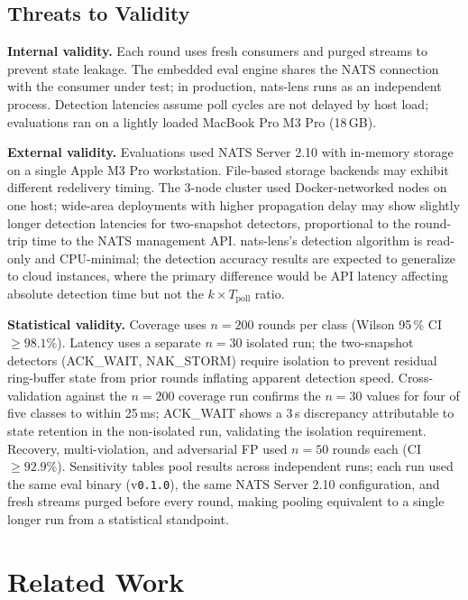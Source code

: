 \documentclass[sigconf,nonacm]{acmart}
\begin{document}
\subsection{Threats to Validity}
\label{sec:threats}

\textbf{Internal validity.} Each round uses fresh consumers and purged
streams to prevent state leakage. The embedded eval engine shares the
NATS connection with the consumer under test; in production, nats-lens
runs as an independent process. Detection latencies assume poll cycles
are not delayed by host load; evaluations ran on a lightly loaded
MacBook Pro M3 Pro (18\,GB).

\textbf{External validity.} Evaluations used NATS Server 2.10 with
in-memory storage on a single Apple M3 Pro workstation.
File-based storage backends may exhibit different redelivery timing.
The 3-node cluster used Docker-networked nodes on one host; wide-area
deployments with higher propagation delay may show slightly longer
detection latencies for two-snapshot detectors, proportional to the
round-trip time to the NATS management API.
nats-lens's detection algorithm is read-only and CPU-minimal; the
detection accuracy results are expected to generalize to cloud instances,
where the primary difference would be API latency affecting absolute
detection time but not the $k \times T_\mathrm{poll}$ ratio.

\textbf{Statistical validity.} Coverage uses $n{=}200$ rounds per class
(Wilson 95\,\% CI $\geq 98.1\%$). Latency uses a separate $n{=}30$
isolated run; the two-snapshot detectors (ACK\_WAIT, NAK\_STORM) require
isolation to prevent residual ring-buffer state from prior rounds
inflating apparent detection speed. Cross-validation against the $n{=}200$
coverage run confirms the $n{=}30$ values for four of five classes to
within 25\,ms; ACK\_WAIT shows a 3\,s discrepancy attributable to
state retention in the non-isolated run, validating the isolation
requirement. Recovery, multi-violation, and
adversarial FP used $n{=}50$ rounds each (CI $\geq 92.9\%$).
Sensitivity tables pool results across independent runs; each run used
the same eval binary (v\texttt{0.1.0}), the same NATS Server 2.10
configuration, and fresh streams purged before every round, making
pooling equivalent to a single longer run from a statistical standpoint.

\section{Related Work}
\end{document}
